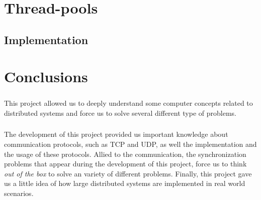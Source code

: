 \documentclass{report}
\begin{document}
	        \paragraph{}
	        
	        \paragraph{}

	\chapter{Thread-pools}
	
	        \paragraph{}
	        
	        \paragraph{}

			\section{Implementation}
	
				\paragraph{}
				
				\paragraph{}

	\chapter{Conclusions}
	
	        \paragraph{}This project allowed us to deeply understand some computer concepts
			related to distributed systems and force us to solve several different type of 
			problems. 
	        
	        \paragraph{} The development of this project provided us important knowledge
			about communication protocols, such as TCP and UDP, as well the implementation and
			the usage of these protocols. Allied to the communication, the synchronization 
			problems that appear during the development of this project, force us to think 
			\emph{out of the box} to solve an variety of different problems. Finally, this 
			project gave us a little idea of how large distributed systems are implemented
			in real world scenarios. 
\end{document}
